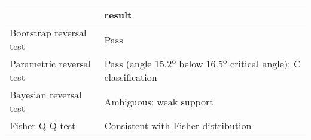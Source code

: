 \begin{tabular}{ll}
\toprule
{} &                                                           result \\
\midrule
Bootstrap reversal test  &                                                             Pass \\
Parametric reversal test &  Pass (angle 15.2º below 16.5º critical angle); C classification \\
Bayesian reversal test   &                                          Ambiguous: weak support \\
Fisher Q-Q test          &                              Consistent with Fisher distribution \\
\bottomrule
\end{tabular}
